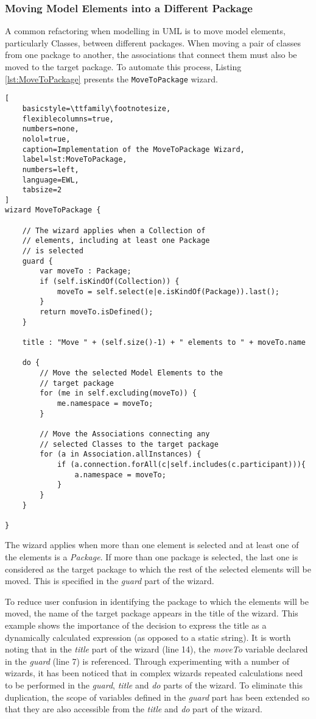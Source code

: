 \subsubsection{Moving Model Elements into a Different Package}
\label{sec:MoveToPackage}

A common refactoring when modelling in UML is to move model elements, particularly Classes, between different packages. When moving a pair of classes from one package to another, the associations that connect them must also be moved to the target package. To automate this process, Listing \ref{lst:MoveToPackage} presents the \texttt{MoveToPackage} wizard.

\begin{lstlisting}[
	basicstyle=\ttfamily\footnotesize, 
	flexiblecolumns=true, 
	numbers=none, 
	nolol=true, 
	caption=Implementation of the MoveToPackage Wizard, 
	label=lst:MoveToPackage, 
	numbers=left, 
	language=EWL, 
	tabsize=2
]
wizard MoveToPackage {
	
	// The wizard applies when a Collection of
	// elements, including at least one Package
	// is selected
	guard { 
		var moveTo : Package;
		if (self.isKindOf(Collection)) {
			moveTo = self.select(e|e.isKindOf(Package)).last();
		}
		return moveTo.isDefined();
	}
	
	title : "Move " + (self.size()-1) + " elements to " + moveTo.name
	
	do {
		// Move the selected Model Elements to the
		// target package
		for (me in self.excluding(moveTo)) {
			me.namespace = moveTo;
		}
		
		// Move the Associations connecting any
		// selected Classes to the target package
		for (a in Association.allInstances) {
			if (a.connection.forAll(c|self.includes(c.participant))){
				a.namespace = moveTo;
			}
		}
	}
	
}
\end{lstlisting}

The wizard applies when more than one element is selected and at least one of the elements is a \emph{Package}. If more than one package is selected, the last one is considered as the target package to which the rest of the selected elements will be moved. This is specified in the \emph{guard} part of the wizard.

To reduce user confusion in identifying the package to which the elements will be moved, the name of the target package appears in the title of the wizard. This example shows the importance of the decision to express the title as a dynamically calculated expression (as opposed to a static string). It is worth noting that in the \emph{title} part of the wizard (line 14), the \emph{moveTo} variable declared in the \emph{guard} (line 7) is referenced. Through experimenting with a number of wizards, it has been noticed that in complex wizards repeated calculations need to be performed in the \emph{guard}, \emph{title} and \emph{do} parts of the wizard. To eliminate this duplication, the scope of variables defined in the \emph{guard} part has been extended so that they are also accessible from the \emph{title} and \emph{do} part of the wizard.
